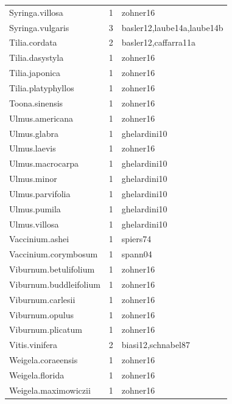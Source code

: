 \documentclass{article}
\begin{document}
\begin{footnotesize}
\begin{table}[ht]
\begin{tabular}{|p{}|p{}|p{}|}
  Syringa.villosa &   1 & zohner16 \\ 
  Syringa.vulgaris &   3 & basler12,laube14a,laube14b \\ 
  Tilia.cordata &   2 & basler12,caffarra11a \\ 
  Tilia.dasystyla &   1 & zohner16 \\ 
  Tilia.japonica &   1 & zohner16 \\ 
  Tilia.platyphyllos &   1 & zohner16 \\ 
  Toona.sinensis &   1 & zohner16 \\ 
  Ulmus.americana &   1 & zohner16 \\ 
  Ulmus.glabra &   1 & ghelardini10 \\ 
  Ulmus.laevis &   1 & zohner16 \\ 
  Ulmus.macrocarpa &   1 & ghelardini10 \\ 
  Ulmus.minor &   1 & ghelardini10 \\ 
  Ulmus.parvifolia &   1 & ghelardini10 \\ 
  Ulmus.pumila &   1 & ghelardini10 \\ 
  Ulmus.villosa &   1 & ghelardini10 \\ 
  Vaccinium.ashei &   1 & spiers74 \\ 
  Vaccinium.corymbosum &   1 & spann04 \\ 
  Viburnum.betulifolium &   1 & zohner16 \\ 
  Viburnum.buddleifolium &   1 & zohner16 \\ 
  Viburnum.carlesii &   1 & zohner16 \\ 
  Viburnum.opulus &   1 & zohner16 \\ 
  Viburnum.plicatum &   1 & zohner16 \\ 
  Vitis.vinifera &   2 & biasi12,schnabel87 \\ 
  Weigela.coraeensis &   1 & zohner16 \\ 
  Weigela.florida &   1 & zohner16 \\ 
  Weigela.maximowiczii &   1 & zohner16 \\ 
  \end{tabular}
\endgroup
\end{table}
\end{footnotesize} 
\end{document}
